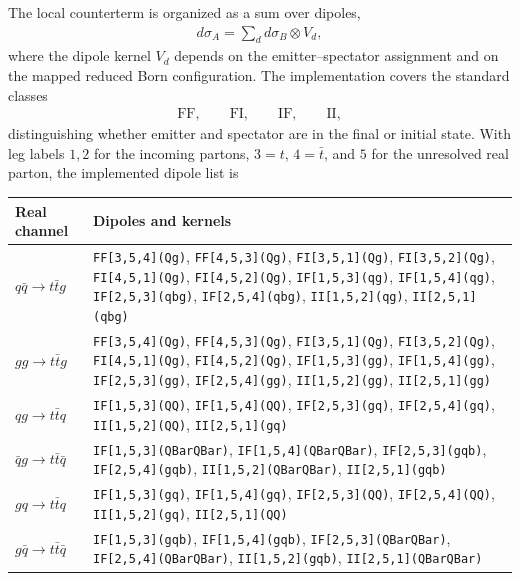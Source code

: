 \documentclass[11pt]{article}
\begin{document}
The local counterterm is organized as a sum over dipoles,
\begin{align}
d\sigma_A = \sum_d d\sigma_B \otimes V_d,
\end{align}
where the dipole kernel $V_d$ depends on the emitter--spectator assignment and on the mapped reduced Born configuration.
The implementation covers the standard classes
\begin{align}
\text{FF},\qquad \text{FI},\qquad \text{IF},\qquad \text{II},
\end{align}
distinguishing whether emitter and spectator are in the final or initial state.
With leg labels $1,2$ for the incoming partons, $3=t$, $4=\bar t$, and $5$ for the unresolved real parton, the implemented dipole list is
\begin{center}
\small
\begin{tabular}{>{\raggedright\arraybackslash}p{}>{\raggedright\arraybackslash}p{}}
\toprule
Real channel & Dipoles and kernels \\
\midrule
$q\bar q\to t\bar t g$ &
\texttt{FF[3,5,4](Qg)}, \texttt{FF[4,5,3](Qg)},
\texttt{FI[3,5,1](Qg)}, \texttt{FI[3,5,2](Qg)}, \texttt{FI[4,5,1](Qg)}, \texttt{FI[4,5,2](Qg)},
\texttt{IF[1,5,3](qg)}, \texttt{IF[1,5,4](qg)}, \texttt{IF[2,5,3](qbg)}, \texttt{IF[2,5,4](qbg)},
\texttt{II[1,5,2](qg)}, \texttt{II[2,5,1](qbg)} \\
$gg\to t\bar t g$ &
\texttt{FF[3,5,4](Qg)}, \texttt{FF[4,5,3](Qg)},
\texttt{FI[3,5,1](Qg)}, \texttt{FI[3,5,2](Qg)}, \texttt{FI[4,5,1](Qg)}, \texttt{FI[4,5,2](Qg)},
\texttt{IF[1,5,3](gg)}, \texttt{IF[1,5,4](gg)}, \texttt{IF[2,5,3](gg)}, \texttt{IF[2,5,4](gg)},
\texttt{II[1,5,2](gg)}, \texttt{II[2,5,1](gg)} \\
$qg\to t\bar t q$ &
\texttt{IF[1,5,3](QQ)}, \texttt{IF[1,5,4](QQ)}, \texttt{IF[2,5,3](gq)}, \texttt{IF[2,5,4](gq)},
\texttt{II[1,5,2](QQ)}, \texttt{II[2,5,1](gq)} \\
$\bar q g\to t\bar t\bar q$ &
\texttt{IF[1,5,3](QBarQBar)}, \texttt{IF[1,5,4](QBarQBar)}, \texttt{IF[2,5,3](gqb)}, \texttt{IF[2,5,4](gqb)},
\texttt{II[1,5,2](QBarQBar)}, \texttt{II[2,5,1](gqb)} \\
$gq\to t\bar t q$ &
\texttt{IF[1,5,3](gq)}, \texttt{IF[1,5,4](gq)}, \texttt{IF[2,5,3](QQ)}, \texttt{IF[2,5,4](QQ)},
\texttt{II[1,5,2](gq)}, \texttt{II[2,5,1](QQ)} \\
$g\bar q\to t\bar t\bar q$ &
\texttt{IF[1,5,3](gqb)}, \texttt{IF[1,5,4](gqb)}, \texttt{IF[2,5,3](QBarQBar)}, \texttt{IF[2,5,4](QBarQBar)},
\texttt{II[1,5,2](gqb)}, \texttt{II[2,5,1](QBarQBar)} \\
\bottomrule
\end{tabular}
\end{center}
\end{document}
